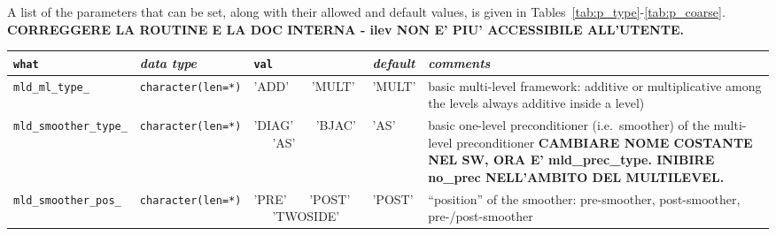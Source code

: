 A list of the parameters that can be set, along with their allowed and
default values, is given in Tables~\ref{tab:p_type}-\ref{tab:p_coarse}. 
\textbf{CORREGGERE LA ROUTINE E LA DOC INTERNA - ilev NON E' PIU'
ACCESSIBILE ALL'UTENTE.}


\begin{sidewaystable}
\begin{center}
\begin{tabular}{|l|l|p{2cm}|l|p{7cm}|}
\hline
\verb|what|              & \emph{data type}        &  \verb|val|      &  \emph{default}  &
\emph{comments} \\ \hline
\verb|mld_ml_type_|      & \verb|character(len=*)|
                         & 'ADD' \ \ \ 'MULT'   
                         & 'MULT'
                         & basic multi-level framework: additive or multiplicative
                           among the levels always additive inside a level)         \\  
\verb|mld_smoother_type_|& \verb|character(len=*)|
                         & 'DIAG' \ \ \ 'BJAC' \ \ \ 'AS'
                         & 'AS'
                         & basic one-level preconditioner (i.e.\ smoother) of the
                           multi-level preconditioner
                           \textbf{CAMBIARE NOME COSTANTE NEL SW, ORA E'
                           mld\_prec\_type. INIBIRE no\_prec NELL'AMBITO DEL
                           MULTILEVEL.}                                 \\
\verb|mld_smoother_pos_| & \verb|character(len=*)|
                         & 'PRE' \ \ \ 'POST' \ \ \ 'TWOSIDE'
                         & 'POST'
                         & ``position'' of the smoother: pre-smoother, post-smoother, 
                           pre-/post-smoother \\
\hline
\end{tabular}
\end{center}
\caption{Parameters defining the type of multi-level preconditioner.
\label{tab:p_type}}                       
\end{sidewaystable}
                   
